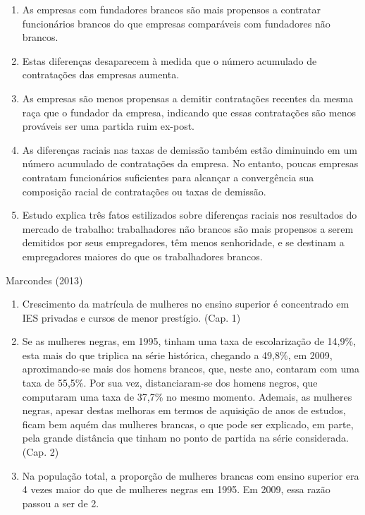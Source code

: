 \documentclass[12pt]{article}
\begin{document}
\begin{enumerate}
    \item As empresas com fundadores brancos são mais propensos a contratar funcionários brancos do que empresas comparáveis com fundadores não brancos. 
    \item Estas diferenças desaparecem à medida que o número acumulado de contratações das empresas aumenta. 
    \item As empresas são menos propensas a demitir contratações recentes da mesma raça que o fundador da empresa, indicando que essas contratações são menos prováveis ser uma partida ruim ex-post. 
    \item As diferenças raciais nas taxas de demissão também estão diminuindo em um número acumulado de contratações da empresa. No entanto, poucas empresas contratam funcionários suficientes para alcançar a convergência sua composição racial de contratações ou taxas de demissão. 
    \item Estudo explica três fatos estilizados sobre diferenças raciais nos resultados do mercado de trabalho: trabalhadores não brancos são mais propensos a serem demitidos por seus empregadores, têm menos senhoridade, e se destinam a empregadores maiores do que os trabalhadores brancos.
\end{enumerate}

\par Marcondes (2013)

\begin{enumerate}
    \item Crescimento da matrícula de mulheres no ensino superior é concentrado em IES privadas e cursos de menor prestígio. (Cap. 1)
    \item Se as mulheres negras, em 1995, tinham uma taxa de escolarização de 14,9\%, esta mais do que triplica na série histórica, chegando a 49,8\%, em 2009, aproximando-se mais dos homens brancos, que, neste ano, contaram com uma taxa de 55,5\%. Por sua vez, distanciaram-se dos homens negros, que computaram uma taxa de 37,7\% no mesmo momento. Ademais, as mulheres negras, apesar destas melhoras em termos de aquisição de anos de estudos, ficam bem aquém das mulheres brancas, o que pode ser explicado, em parte, pela grande distância que tinham no ponto de partida na série considerada. (Cap. 2)
    \item Na população total, a proporção de mulheres brancas com ensino superior era 4 vezes maior do que de mulheres negras em 1995. Em 2009, essa razão passou a ser de 2.
\end{enumerate}
\end{document}

